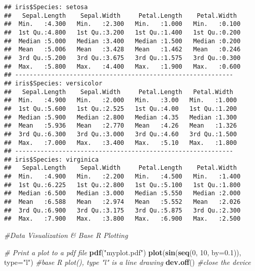 \documentclass[
]{article}
\newenvironment{Shaded}{\begin{snugshade}}{\end{snugshade}}
\newcommand{\AttributeTok}[1]{\textcolor[rgb]{0.13,0.29,0.53}{#1}}
\newcommand{\CommentTok}[1]{\textcolor[rgb]{0.56,0.35,0.01}{\textit{#1}}}
\newcommand{\DecValTok}[1]{\textcolor[rgb]{0.00,0.00,0.81}{#1}}
\newcommand{\FloatTok}[1]{\textcolor[rgb]{0.00,0.00,0.81}{#1}}
\newcommand{\FunctionTok}[1]{\textcolor[rgb]{0.13,0.29,0.53}{\textbf{#1}}}
\newcommand{\NormalTok}[1]{#1}
\newcommand{\StringTok}[1]{\textcolor[rgb]{0.31,0.60,0.02}{#1}}
\begin{document}
\begin{verbatim}
## iris$Species: setosa
##   Sepal.Length    Sepal.Width     Petal.Length    Petal.Width   
##  Min.   :4.300   Min.   :2.300   Min.   :1.000   Min.   :0.100  
##  1st Qu.:4.800   1st Qu.:3.200   1st Qu.:1.400   1st Qu.:0.200  
##  Median :5.000   Median :3.400   Median :1.500   Median :0.200  
##  Mean   :5.006   Mean   :3.428   Mean   :1.462   Mean   :0.246  
##  3rd Qu.:5.200   3rd Qu.:3.675   3rd Qu.:1.575   3rd Qu.:0.300  
##  Max.   :5.800   Max.   :4.400   Max.   :1.900   Max.   :0.600  
## ------------------------------------------------------------ 
## iris$Species: versicolor
##   Sepal.Length    Sepal.Width     Petal.Length   Petal.Width   
##  Min.   :4.900   Min.   :2.000   Min.   :3.00   Min.   :1.000  
##  1st Qu.:5.600   1st Qu.:2.525   1st Qu.:4.00   1st Qu.:1.200  
##  Median :5.900   Median :2.800   Median :4.35   Median :1.300  
##  Mean   :5.936   Mean   :2.770   Mean   :4.26   Mean   :1.326  
##  3rd Qu.:6.300   3rd Qu.:3.000   3rd Qu.:4.60   3rd Qu.:1.500  
##  Max.   :7.000   Max.   :3.400   Max.   :5.10   Max.   :1.800  
## ------------------------------------------------------------ 
## iris$Species: virginica
##   Sepal.Length    Sepal.Width     Petal.Length    Petal.Width   
##  Min.   :4.900   Min.   :2.200   Min.   :4.500   Min.   :1.400  
##  1st Qu.:6.225   1st Qu.:2.800   1st Qu.:5.100   1st Qu.:1.800  
##  Median :6.500   Median :3.000   Median :5.550   Median :2.000  
##  Mean   :6.588   Mean   :2.974   Mean   :5.552   Mean   :2.026  
##  3rd Qu.:6.900   3rd Qu.:3.175   3rd Qu.:5.875   3rd Qu.:2.300  
##  Max.   :7.900   Max.   :3.800   Max.   :6.900   Max.   :2.500
\end{verbatim}

\begin{Shaded}
\begin{Highlighting}[]
\CommentTok{\#Data Visualization \& Base R Plotting}

\CommentTok{\# Print a plot to a pdf file}
\FunctionTok{pdf}\NormalTok{(}\StringTok{"myplot.pdf"}\NormalTok{)}
\FunctionTok{plot}\NormalTok{(}\FunctionTok{sin}\NormalTok{(}\FunctionTok{seq}\NormalTok{(}\DecValTok{0}\NormalTok{, }\DecValTok{10}\NormalTok{, }\AttributeTok{by=}\FloatTok{0.1}\NormalTok{)), }\AttributeTok{type=}\StringTok{"l"}\NormalTok{) }\CommentTok{\#base R plot(), type "l" is a line drawing}
\FunctionTok{dev.off}\NormalTok{() }\CommentTok{\#close the device}
\end{Highlighting}
\end{Shaded}
\end{document}
